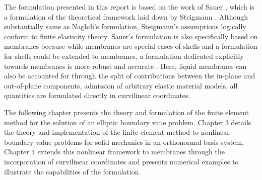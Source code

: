 The formulation presented in this report is based on the work of Sauer \cite{sauer2014}, which is a formulation of
 the theoretical framework laid down by Steigmann \cite{steigmann1999}. Although substantially same as Naghdi's \cite{truesdell1984}
 formulation, Steigmann's assumptions logically conform to finite elasticity theory. Sauer's formulation is also specifically based on
 membranes because while membranes are special cases of shells and a formulation for shells could be extended to membranes, a formulation dedicated explicitly
 towards membranes is more robust and accurate \cite{sauer2014}. Here, liquid membranes can also be accounted for through the
 split of contributions between the in-plane and out-of-plane components, admission of arbitrary elastic material models,
 all quantities are formulated directly in curvilinear coordinates.

The following chapter presents the theory and formulation of the finite element method for the solution of an elliptic
 boundary vaue problem. Chapter 3 details the theory and implementation of the finite element method to nonlinear boundary
 value problems for solid mechanics in an orthonormal basis system. Chapter 4 extends this nonlinear framework to membranes
 through the incorporation of curvilinear coordinates and presents numerical examples to illustrate the capabilities of the
 formulation.
\afterpage{\blankpage}
